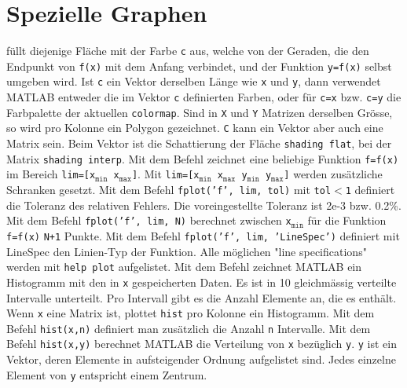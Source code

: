 \section{Spezielle Graphen}
 füllt diejenige Fläche mit der Farbe \texttt{c} aus, welche von der Geraden, die den Endpunkt von \texttt{f(x)} mit dem Anfang verbindet, und der Funktion \texttt{y=f(x)} selbst umgeben wird. Ist \texttt{c} ein Vektor derselben Länge wie \texttt{x} und \texttt{y}, dann verwendet MATLAB entweder die im Vektor \texttt{c} definierten Farben, oder für \texttt{c=x} bzw. \texttt{c=y} die Farbpalette der aktuellen \texttt{colormap}. Sind in  \texttt{X} und \texttt{Y} Matrizen derselben Grösse, so wird pro Kolonne ein Polygon gezeichnet. \texttt{C} kann ein Vektor aber auch eine Matrix sein. Beim Vektor ist die Schattierung der Fläche {\color{red}\texttt{shading flat}}, bei der Matrix {\color{red}\texttt{shading interp}}.
\newline\newline
Mit dem Befehl  zeichnet eine beliebige Funktion \texttt{f=f(x)} im Bereich \texttt{lim=[x$_{\texttt{min}}$ x$_{\texttt{max}}$]}. Mit \texttt{lim=[x$_{\texttt{min}}$ x$_{\texttt{max}}$ y$_{\texttt{min}}$ y$_{\texttt{max}}$]} werden zusätzliche Schranken gesetzt. Mit dem Befehl {\color{red}\texttt{fplot('f', lim, tol)}} mit \texttt{tol$<$1} definiert die Toleranz des relativen Fehlers. Die voreingestellte Toleranz ist 2e-3 bzw. 0.2\%. Mit dem Befehl {\color{red}\texttt{fplot('f', lim, N)}} berechnet zwischen \texttt{x$_{\texttt{min}}$} für die Funktion \texttt{f=f(x)} \texttt{N+1} Punkte. Mit dem Befehl {\color{red}\texttt{fplot('f', lim, 'LineSpec')}} definiert mit LineSpec den Linien-Typ der Funktion. Alle möglichen "line specifications" werden mit \texttt{help plot} aufgelistet.    
\newline\newline
Mit dem Befehl  zeichnet MATLAB ein Histogramm mit den in \texttt{x} gespeicherten Daten. Es ist in 10 gleichmässig verteilte Intervalle unterteilt. Pro Intervall gibt es die Anzahl Elemente an, die es enthält. Wenn \texttt{x} eine Matrix ist, plottet \texttt{hist} pro Kolonne ein Histogramm. Mit dem Befehl {\color{red}\texttt{hist(x,n)}} definiert man zusätzlich die Anzahl \texttt{n} Intervalle. Mit dem Befehl {\color{red}\texttt{hist(x,y)}} berechnet MATLAB die Verteilung von \texttt{x} bezüglich \texttt{y}. \texttt{y} ist ein Vektor, deren Elemente in aufsteigender Ordnung aufgelistet sind. Jedes einzelne Element von \texttt{y} entspricht einem Zentrum.     
